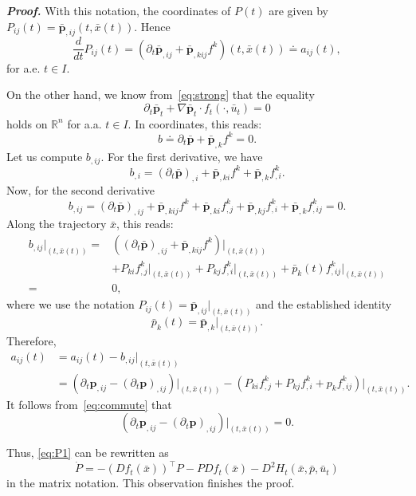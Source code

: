 \documentclass[sn-mathphys-num]{sn-jnl}
\numberwithin{equation}{section}
\theoremstyle{mythm}
\theoremstyle{mydef}
\renewenvironment{proof}{\smallskip\noindent\emph{\textbf{Proof.}}%
  \hspace{1pt}}{\hspace{-5pt}{\nobreak\quad\nobreak\hfill\nobreak%
    $\square$\vspace{2pt}\par}\smallskip\goodbreak}
\newcommand{\R}{\mathbb{R}}
\newcommand{\T}{\intercal}
\begin{document}
\begin{proof}
With this notation, the coordinates of \( P(t) \) are given by \( P_{ij}(t) = \bar{\bm p}_{,ij}(t,\bar x(t)) \).
Hence
\begin{equation}
  \label{eq:P1}
  \frac{d}{dt} P_{ij}(t) = \left(\partial_t \bar{\bm p}_{,ij} + \bar{\bm p}_{,kij} f^k\right)(t,\bar x(t)) \doteq a_{ij}(t),
\end{equation}
for a.e. \( t \in I \). 

On the other hand, we know from~\eqref{eq:strong} that the equality
\[
\partial_t \bar{\bm p}_t + \nabla \bar{\bm p}_t \cdot f_t(\cdot,\bar{u}_t) = 0
\]
holds on $\R^n$ for a.a. \( t \in I \). In coordinates, this reads:
\[
b \doteq \partial_t \bar{\bm p} + \bar{\bm p}_{,k} f^{k} = 0.
\]
Let us compute \( b_{,ij} \).
For the first derivative, we have
\[
b_{,i} = (\partial_t \bar{\bm p})_{,i} + \bar{\bm p}_{,ki} f^{k} + \bar{\bm p}_{,k} f^k_{,i}.
\]
Now, for the second derivative
\[
b_{,ij} = (\partial_t \bar{\bm p})_{,ij} + \bar{\bm p}_{,kij} f^{k} + \bar{\bm p}_{,ki} f^k_{,j} + \bar{\bm p}_{,kj} f^k_{,i} + \bar{\bm p}_{,k} f^k_{,ij} = 0.
\]
Along the trajectory \(\bar x \), this reads:
\begin{align*}
b_{,ij}\big|_{(t,\bar x(t))}  = & \left((\partial_t \bar{\bm p})_{,ij} + \bar{\bm p}_{,kij} f^{k}\right)\big|_{(t,\bar x(t))}\\ & +
P_{ki} f^k_{,j}\big|_{(t,\bar x(t))} + P_{kj} f^k_{,i}\big|_{(t,\bar x(t))} + \bar{p}_{k}(t) f^k_{,ij}\big|_{(t,\bar x(t))}\\ 
 = & 0,
\end{align*}
where we use the notation \( P_{ij}(t) = \bar{\bm p}_{,ij}\big|_{(t,\bar x(t))} \) and the established identity 
\[
    \bar{p}_k(t) = \bar{\bm p}_{,k}\big|_{(t,\bar x(t))}.
\]
Therefore,
\begin{align*}
  a_{ij}(t) & = a_{ij}(t) - b_{,ij}\big|_{(t,\bar x(t))}\\
  & = \left(\partial_t \bm p_{,ij} - (\partial_t \bm p)_{,ij}\right)\big|_{(t,\bar x(t))} - \left(P_{ki} f^k_{,j} + P_{kj}f^k_{,i} + p_{k}f^k_{,ij}\right)\big|_{(t,\bar{x}(t))}.
\end{align*}
It follows from~\eqref{eq:commute} that 
\[
    \left(\partial_t \bm p_{,ij} - (\partial_t \bm p)_{,ij}\right)\big|_{(t,\bar x(t))} = 0.
\]

Thus, \eqref{eq:P1} can be rewritten as
\[
\dot P = - (D f_t(\bar x))^{\T} P - P Df_t(\bar x) - D^2 H_t(\bar x,\bar p, \bar u_t)
\]
in the matrix notation. This observation finishes the proof.
\end{proof}
\end{document}
